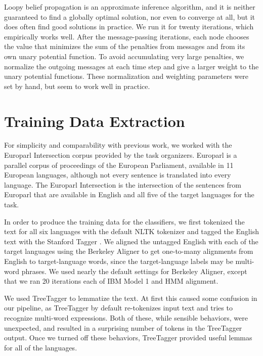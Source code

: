 \documentclass[11pt,letterpaper]{article}
\begin{document}
Loopy belief propagation is an approximate inference algorithm, and it is
neither guaranteed to find a globally optimal solution, nor even to converge at
all, but it does often find good solutions in practice. We run it for twenty
iterations, which empirically works well. After the message-passing iterations,
each node chooses the value that minimizes the sum of the penalties from
messages and from its own unary potential function. To avoid accumulating very
large penalties, we normalize the outgoing messages at each time step and give
a larger weight to the unary potential functions. These normalization and
weighting parameters were set by hand, but seem to work well in practice.

\section{Training Data Extraction}
\label{extraction}
For simplicity and comparability with previous work, we worked with the
Europarl Intersection corpus provided by the task organizers. Europarl
\cite{europarl} is a parallel corpus of proceedings of the European Parliament,
available in 11 European languages, although not every sentence is translated
into every language. The Europarl Intersection is the intersection of the
sentences from Europarl that are available in English and all five of the
target languages for the task.

In order to produce the training data for the classifiers, we first tokenized
the text for all six languages with the default NLTK tokenizer and tagged the
English text with the Stanford Tagger
\cite{Toutanova03feature-richpart-of-speech}. We aligned the untagged English
with each of the target languages using the Berkeley Aligner
\cite{denero-klein:2007:ACLMain} to get one-to-many alignments from English to
target-language words, since the target-language labels may be multi-word
phrases. We used nearly the default settings for Berkeley Aligner, except that
we ran 20 iterations each of IBM Model 1 and HMM alignment.

We used TreeTagger \cite{Schmid95improvementsin} to lemmatize the text. At
first this caused some confusion in our pipeline, as TreeTagger by default
re-tokenizes input text and tries to recognize multi-word expressions. Both of
these, while sensible behaviors, were unexpected, and resulted in a surprising 
number of tokens in the TreeTagger output. Once we turned off these behaviors,
TreeTagger provided useful lemmas for all of the languages.
\end{document}
